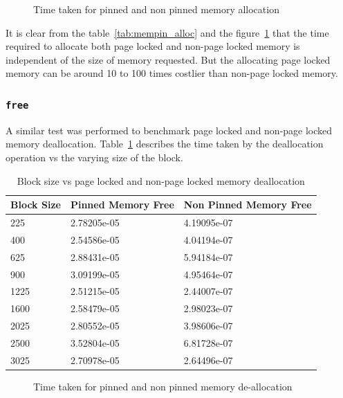 \begin{figure}[h]
  
  \caption{Time taken for pinned and non pinned memory allocation}
  \label{fig:mempin_alloc}
\end{figure}

It is clear from the table~\ref{tab:mempin_alloc} and the figure~\ref{fig:mempin_alloc}
that the time required to allocate both page locked and non-page locked memory
is independent of the size of memory requested. But the allocating page locked
memory can be around 10 to 100 times costlier than non-page locked memory.

\subsubsection{\texttt{free}}
A similar test was performed to benchmark page locked and non-page locked memory
deallocation. Table~\ref{tab:mempin_free} describes the time taken by the deallocation
operation vs the varying size of the block.

\begin{table}[h]
  \centering
  \caption{Block size vs page locked and non-page locked memory deallocation}
  \begin{tabular}{l l l}
    \hline
    Block Size & Pinned Memory Free & Non Pinned Memory Free \\
    \hline
    225        & 2.78205e-05        & 4.19095e-07            \\
    400        & 2.54586e-05        & 4.04194e-07            \\
    625        & 2.88431e-05        & 5.94184e-07            \\
    900        & 3.09199e-05        & 4.95464e-07            \\
    1225       & 2.51215e-05        & 2.44007e-07            \\
    1600       & 2.58479e-05        & 2.98023e-07            \\
    2025       & 2.80552e-05        & 3.98606e-07            \\
    2500       & 3.52804e-05        & 6.81728e-07            \\
    3025       & 2.70978e-05        & 2.64496e-07            \\
    \hline
  \end{tabular}
  \label{tab:mempin_free}
\end{table}

\begin{figure}[h]
  
  \caption{Time taken for pinned and non pinned memory de-allocation}
  \label{fig:mempin_free}
\end{figure}

